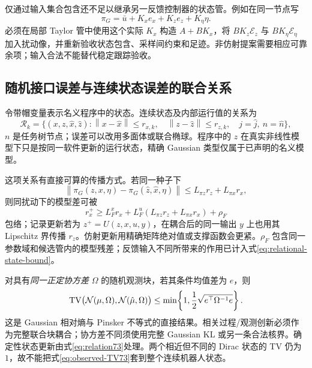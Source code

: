 \documentclass[UTF8,fontset=fandol,zihao=5,a4paper]{ctexart}
\newcommand{\norm}[1]{\left\lVert#1\right\rVert}
\theoremstyle{definition}
\theoremstyle{remark}\newtheorem{remark}[theorem]{说明}
\numberwithin{equation}{section}
\begin{document}
仅通过输入集合包含还不足以继承另一反馈控制器的状态管。例如在同一节点写
\begin{equation}
\pi_G=\bar u+K_xe_x+K_ze_z+K_\eta\eta.
\end{equation}
必须在局部 Taylor 管中使用这个实际 $K_x$ 构造 $A+BK_x$，将 $BK_z\mathcal E_z$ 与 $BK_\eta\mathcal E_\eta$ 加入扰动像，并重新验收状态包含、采样间约束和足迹。非仿射提案需要相应可靠余项；输入合法不能替代稳定跟踪验收。

\subsection{随机接口误差与连续状态误差的联合关系}
令带帽变量表示名义程序中的状态。连续状态及内部运行值的关系为
\begin{equation}
\mathscr R_k=\{(x,z,\hat x,\hat z):
\norm{x-\hat x}\le r_{x,k},\quad
\norm{z-\hat z}\le r_{z,k},\quad
j=\hat j,\ n=\hat n\},
\label{eq:relation73}
\end{equation}
$n$ 是任务树节点；误差可以改用多面体或联合椭球。程序中的 $z$ 在真实非线性模型下只是按同一软件更新的运行状态，精确 Gaussian 类型仅属于已声明的名义模型。

这项关系有直接可算的传播方式。若同一种子下
\begin{equation}
\norm{\pi_G(z,x,\eta)-\pi_G(\hat z,\hat x,\eta)}
\le L_{\pi z}r_z+L_{\pi x}r_x,
\end{equation}
则同扰动下的模型差可被
\begin{equation}
r_x^+\ge L_F^x r_x+L_F^u(L_{\pi z}r_z+L_{\pi x}r_x)+\rho_F
\label{eq:relational-state-bound}
\end{equation}
包络；记录更新若为 $z^+=U(z,x,u,y)$，在耦合后的同一输出 $y$ 上也用其 Lipschitz 界传播 $r_z$。仿射更新用精确矩阵绝对值或支撑函数会更紧。$\rho_F$ 包含同一参数域和候选管内的模型残差；反馈输入不同所带来的作用已计入式\eqref{eq:relational-state-bound}。

对具有\emph{同一正定协方差} $\Omega$ 的随机观测块，若其条件均值差为 $e$，则
\begin{equation}
\operatorname{TV}\bigl(\mathcal N(\mu,\Omega),\mathcal N(\hat\mu,\Omega)\bigr)
\le\min\!\left\{1,\frac12\sqrt{e^\top\Omega^{-1}e}\right\}.
\label{eq:observed-TV73}
\end{equation}
这是 Gaussian 相对熵与 Pinsker 不等式的直接结果。相关过程/观测创新必须作为完整联合块耦合；协方差不同须使用完整 Gaussian KL 或另一条合法核界。确定性状态更新由式\eqref{eq:relation73}处理。两个相近但不同的 Dirac 状态的 TV 仍为 $1$，故不能把式\eqref{eq:observed-TV73}套到整个连续机器人状态。
\end{document}

